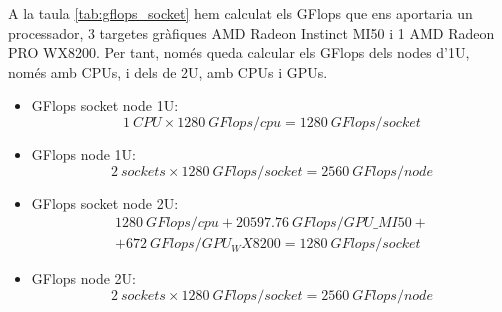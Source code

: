 A la taula \ref{tab:gflops_socket} hem calculat els GFlops que ens aportaria un processador, 3 targetes gràfiques AMD Radeon Instinct MI50 i 1 AMD Radeon PRO WX8200. Per tant, només queda calcular els GFlops dels nodes d'1U, només amb CPUs, i dels de 2U, amb CPUs i GPUs.

\begin{itemize}
    \item GFlops socket node 1U:\\
        \[ 1\ CPU \times 1280\ GFlops/cpu = 1280\ GFlops/socket\]
    \item GFlops node 1U:\\
\[2\ sockets \times 1280\ GFlops/socket = 2560\ GFlops/node\]
    \item GFlops socket node 2U:\\
        \[ \begin{aligned} 1280\ GFlops/cpu + 20597.76\ GFlops/GPU\_MI50 + \\ + 672\ GFlops/GPU_WX8200 = 1280\ GFlops/socket \end{aligned} \]

    \item GFlops node 2U:\\
\[2\ sockets \times 1280\ GFlops/socket = 2560\ GFlops/node\]
\end{itemize}
